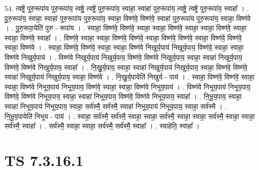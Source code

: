 \documentclass[17pt]{extarticle}
\begin{document}
54. त्वष्ट्रे॑ पुरु॒रूपा॑य पुरु॒रूपा॑य॒ त्वष्ट्रे॒ त्वष्ट्रे॑ पुरु॒रूपा॑य॒ स्वाहा॒ स्वाहा॑ पुरु॒रूपा॑य॒ त्वष्ट्रे॒ त्वष्ट्रे॑ पुरु॒रूपा॑य॒ स्वाहा᳚ । . पु॒रु॒रूपा॑य॒ स्वाहा॒ स्वाहा॑ पुरु॒रूपा॑य पुरु॒रूपा॑य॒ स्वाहा॒ विष्ण॑वे॒ विष्ण॑वे॒ स्वाहा॑ पुरु॒रूपा॑य पुरु॒रूपा॑य॒ स्वाहा॒ विष्ण॑वे । . पु॒रु॒रूपा॒येति॑ पुरु - रूपा॑य । . स्वाहा॒ विष्ण॑वे॒ विष्ण॑वे॒ स्वाहा॒ स्वाहा॒ विष्ण॑वे॒ स्वाहा॒ स्वाहा॒ विष्ण॑वे॒ स्वाहा॒ स्वाहा॒ विष्ण॑वे॒ स्वाहा᳚ । . विष्ण॑वे॒ स्वाहा॒ स्वाहा॒ विष्ण॑वे॒ विष्ण॑वे॒ स्वाहा॒ विष्ण॑वे॒ विष्ण॑वे॒ स्वाहा॒ विष्ण॑वे॒ विष्ण॑वे॒ स्वाहा॒ विष्ण॑वे । . स्वाहा॒ विष्ण॑वे॒ विष्ण॑वे॒ स्वाहा॒ स्वाहा॒ विष्ण॑वे निखुर्य॒पाय॑ निखुर्य॒पाय॒ विष्ण॑वे॒ स्वाहा॒ स्वाहा॒ विष्ण॑वे निखुर्य॒पाय॑ । . विष्ण॑वे निखुर्य॒पाय॑ निखुर्य॒पाय॒ विष्ण॑वे॒ विष्ण॑वे निखुर्य॒पाय॒ स्वाहा॒ स्वाहा॑ निखुर्य॒पाय॒ विष्ण॑वे॒ विष्ण॑वे निखुर्य॒पाय॒ स्वाहा᳚ । . नि॒खु॒र्य॒पाय॒ स्वाहा॒ स्वाहा॑ निखुर्य॒पाय॑ निखुर्य॒पाय॒ स्वाहा॒ विष्ण॑वे॒ विष्ण॑वे॒ स्वाहा॑ निखुर्य॒पाय॑ निखुर्य॒पाय॒ स्वाहा॒ विष्ण॑वे । . नि॒खु॒र्य॒पायेति॑ निखुर्य - पाय॑ । . स्वाहा॒ विष्ण॑वे॒ विष्ण॑वे॒ स्वाहा॒ स्वाहा॒ विष्ण॑वे निभूय॒पाय॑ निभूय॒पाय॒ विष्ण॑वे॒ स्वाहा॒ स्वाहा॒ विष्ण॑वे निभूय॒पाय॑ । . विष्ण॑वे निभूय॒पाय॑ निभूय॒पाय॒ विष्ण॑वे॒ विष्ण॑वे निभूय॒पाय॒ स्वाहा॒ स्वाहा॑ निभूय॒पाय॒ विष्ण॑वे॒ विष्ण॑वे निभूय॒पाय॒ स्वाहा᳚ । . नि॒भू॒य॒पाय॒ स्वाहा॒ स्वाहा॑ निभूय॒पाय॑ निभूय॒पाय॒ स्वाहा॒ सर्व॑स्मै॒ सर्व॑स्मै॒ स्वाहा॑ निभूय॒पाय॑ निभूय॒पाय॒ स्वाहा॒ सर्व॑स्मै । . नि॒भू॒य॒पायेति॑ निभूय - पाय॑ । . स्वाहा॒ सर्व॑स्मै॒ सर्व॑स्मै॒ स्वाहा॒ स्वाहा॒ सर्व॑स्मै॒ स्वाहा॒ स्वाहा॒ सर्व॑स्मै॒ स्वाहा॒ स्वाहा॒ सर्व॑स्मै॒ स्वाहा᳚ । . सर्व॑स्मै॒ स्वाहा॒ स्वाहा॒ सर्व॑स्मै॒ सर्व॑स्मै॒ स्वाहा᳚ । . स्वाहेति॒ स्वाहा᳚ । \newline
\pagebreak
{}

\section{ TS 7.3.16.1 }
\end{document}
